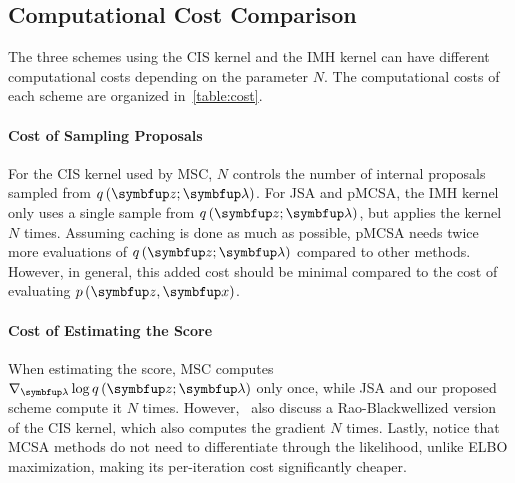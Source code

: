 \begin{wraptable}{r}{0.55\textwidth}
  \centering
  \vspace{-0.5in}
  
  \vspace{-0.2in}
\end{wraptable}
%
\vspace{-0.05in}
\subsection{Computational Cost Comparison}
\vspace{-0.05in}
The three schemes using the CIS kernel and the IMH kernel can have different computational costs depending on the parameter \(N\).
The computational costs of each scheme are organized in~\cref{table:cost}.

\vspace{-0.1in}
\paragraph{Cost of Sampling Proposals}
For the CIS kernel used by MSC, \(N\) controls the number of internal proposals sampled from \(q\,(\vz; \vlambda)\).
For JSA and pMCSA, the IMH kernel only uses a single sample from \(q\,(\vz; \vlambda)\), but applies the kernel \(N\) times.
Assuming caching is done as much as possible, pMCSA needs twice more evaluations of \(q\,(\vz; \vlambda)\) compared to other methods.
However, in general, this added cost should be minimal compared to the cost of evaluating \(p\,(\vz,\vx)\).

\vspace{-0.1in}
\paragraph{Cost of Estimating the Score}
When estimating the score, MSC computes \(\nabla_{\vlambda} \log q\,(\vz; \vlambda)\) only once, while JSA and our proposed scheme compute it \(N\) times.
However,~\cite{NEURIPS2020_b2070693} also discuss a Rao-Blackwellized version of the CIS kernel, which also computes the gradient \(N\) times.
Lastly, notice that MCSA methods do not need to differentiate through the likelihood, unlike ELBO maximization, making its per-iteration cost significantly cheaper.

